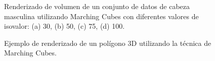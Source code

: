 \begin{figure}[!ht]
	\begin{center}
	\end{center}\vspace*{-0.6cm}
	\caption[Ilustración de Marching Cubes]{Renderizado de volumen de un conjunto de datos de cabeza masculina utilizando Marching Cubes con diferentes valores de isovalor: (a) 30, (b) 50, (c) 75, (d) 100.}
	\label{fig-marching-cubes1}
	\end{figure}


\begin{figure}[!ht]
	\begin{center}
	\end{center}\vspace*{-0.6cm}
	\caption[Ilustración de Marching Cubes]{Ejemplo de renderizado de un polígono 3D utilizando la técnica de Marching Cubes.}
	\label{fig-marching-cubes1}
	\end{figure}

